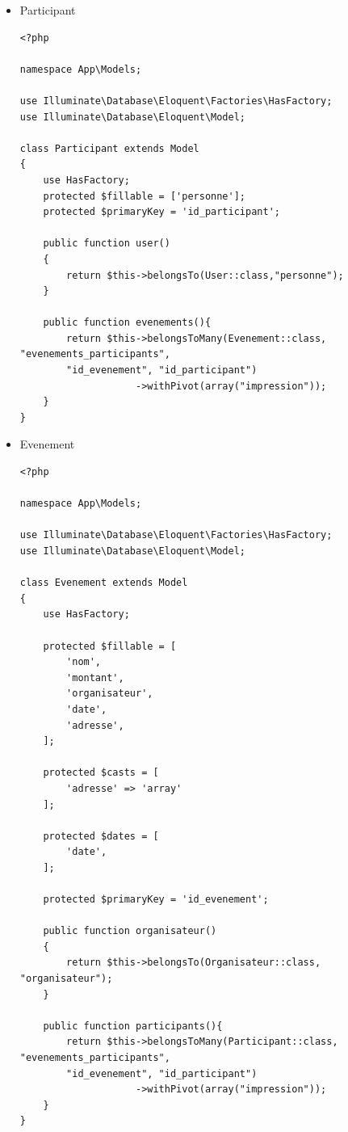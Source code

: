\documentclass[12pt,a4paper]{article}
\begin{document}
\begin{itemize}
\begin{verbatim}
    public function evenements()
    {
        return $this->hasMany(Evenement::class, "organisateur");
    }
}
\end{verbatim}
\item[•] Participant
\begin{verbatim}
<?php

namespace App\Models;

use Illuminate\Database\Eloquent\Factories\HasFactory;
use Illuminate\Database\Eloquent\Model;

class Participant extends Model
{
    use HasFactory;
    protected $fillable = ['personne'];
    protected $primaryKey = 'id_participant';

    public function user()
    {
        return $this->belongsTo(User::class,"personne");
    }

    public function evenements(){
        return $this->belongsToMany(Evenement::class, "evenements_participants", 
        "id_evenement", "id_participant")
                    ->withPivot(array("impression"));
    }
}
\end{verbatim}
\item[•] Evenement
\begin{verbatim}
<?php

namespace App\Models;

use Illuminate\Database\Eloquent\Factories\HasFactory;
use Illuminate\Database\Eloquent\Model;

class Evenement extends Model
{
    use HasFactory;

    protected $fillable = [
        'nom',
        'montant',
        'organisateur',
        'date',
        'adresse',
    ];

    protected $casts = [
        'adresse' => 'array'
    ];

    protected $dates = [
        'date',
    ];

    protected $primaryKey = 'id_evenement';

    public function organisateur()
    {
        return $this->belongsTo(Organisateur::class, "organisateur");
    }

    public function participants(){
        return $this->belongsToMany(Participant::class, "evenements_participants", 
        "id_evenement", "id_participant")
                    ->withPivot(array("impression"));
    }
}

\end{verbatim}
\end{itemize}
\end{document}
